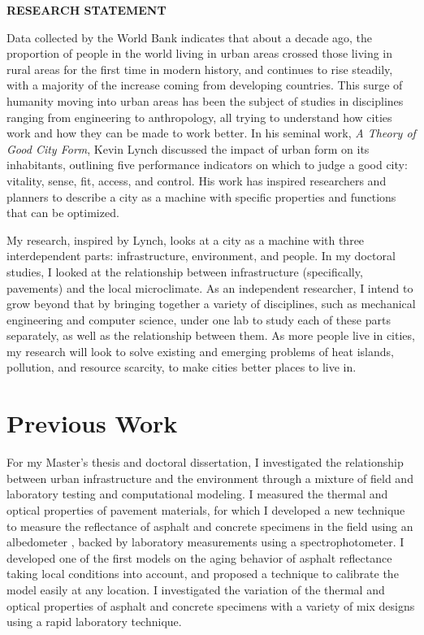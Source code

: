 \documentclass[12pt]{article}
\begin{document}
 \sloppy %

\begin{center}
{\large \uppercase{\textbf{Research Statement}}}
\end{center}

Data collected by the World Bank \cite{Urbanpop19:online} indicates that about a decade ago, the proportion of people in the world living in urban areas crossed those living in rural areas for the first time in modern history, and continues to rise steadily, with a majority of the increase coming from developing countries. This surge of humanity moving into urban areas has been the subject of studies in disciplines ranging from engineering to anthropology, all trying to understand how cities work and how they can be made to work better. In his seminal work, \textit{A Theory of Good City Form}, Kevin Lynch \cite{lynch1984good} discussed the impact of urban form on its inhabitants, outlining five performance indicators on which to judge a good city: vitality, sense, fit, access, and control. His work has inspired researchers and planners to describe a city as a machine \cite{molotch1976city, mcfarlane2011city, lloyd2001city, oke1973city} with specific properties and functions that can be optimized.

My research, inspired by Lynch, looks at a city as a machine with three interdependent parts: infrastructure, environment, and people. In my doctoral studies, I looked at the relationship between infrastructure (specifically, pavements) and the local microclimate. As an independent researcher, I intend to grow beyond that by bringing together a variety of disciplines, such as mechanical engineering and computer science, under one lab to study each of these parts separately, as well as the relationship between them. As more people live in cities, my research will look to solve existing and emerging problems of heat islands, pollution, and resource scarcity, to make cities better places to live in.

\section*{Previous Work}
For my Master's thesis and doctoral dissertation, I investigated the relationship between urban infrastructure and the environment through a mixture of field and laboratory testing and computational modeling. I measured the thermal and optical properties of pavement materials, for which I developed a new technique to measure the reflectance of asphalt and concrete specimens in the field using an albedometer \cite{sen2018albedo}, backed by laboratory measurements using a spectrophotometer. I developed one of the first models on the aging behavior of asphalt reflectance \cite{sen2016aging} taking local conditions into account, and proposed a technique to calibrate the model easily at any location. I investigated the variation of the thermal and optical properties of asphalt and concrete specimens with a variety of mix designs using a rapid laboratory technique.
\end{document}
